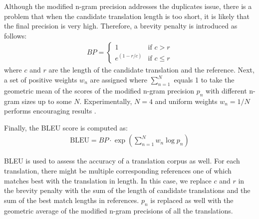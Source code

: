 Although the modified n-gram precision addresses the duplicates issue, there is a problem that when the candidate translation length is too short, it is likely that the final precision is very high. Therefore, a brevity penalty is introduced as follows:
\begin{align*}
BP = \left\{
\begin{array}{lc}
1 & \text{if } c > r \\
e^{(1-r/c)} & \text{if } c \leq r
\end{array}\right.
\end{align*}
where $ c $ and $ r $ are the length of the candidate translation and the reference. Next, a set of positive weights $ w_{n} $ are assigned where $ \sum_{n=1}^{N} $ equals 1 to take the geometric mean of the scores of the modified n-gram precision $ p_{n} $ with different n-gram sizes up to some $ N $. Experimentally, $ N=4 $ and uniform weights $ w_{n} = 1/N $ performs encouraging results \cite{Papineni2002}. 

Finally, the BLEU score is computed as:
\begin{align*}
\text{BLEU} = BP\cdot \exp(\sum_{n=1}^{N}w_{n}\log p_{n})
\end{align*}

BLEU is used to assess the accuracy of a translation corpus as well. For each translation, there might be multiple corresponding references one of which matches best with the translation in length. In this case, we replace $ c $ and $ r $ in the brevity penalty with the sum of the length of candidate translations and the sum of the best match lengths in references. $ p_{n} $ is replaced as well with the geometric average of the modified n-gram precisions of all the translations. 

